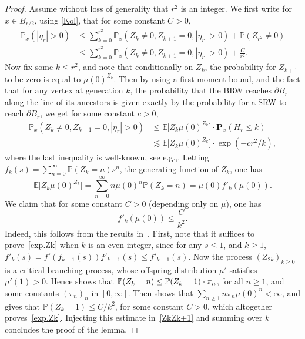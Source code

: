 \documentclass[11pt]{article}
\newcommand{\eg}{e.g.,\xspace}
\numberwithin{equation}{section}
\theoremstyle{plain}
\theoremstyle{definition}
\newcommand{\1}{{\text{\Large $\mathfrak 1$}}}
\begin{document}
\begin{proof}
Assume without loss of generality that $r^2$ is an integer. We first write for $x\in B_{r/2}$, using \eqref{Kol}, that for some constant $C>0$,
\begin{align*}
\mathbb P_x(|\eta_r| >0 ) & \le \sum_{k=0}^{r^2} \mathbb P_x(Z_k\neq 0, Z_{k+1}=0, |\eta_r|>0) + \mathbb P(Z_{r^2} \neq 0) \\
& \le\sum_{k=0}^{r^2} \mathbb P_x(Z_k\neq 0, Z_{k+1}=0, |\eta_r|>0) + \frac{C}{r^2}.
\end{align*}
Now fix some $k\le r^2$, and note that conditionally on $Z_k$, the probability for $Z_{k+1}$ to be zero is equal to $\mu(0)^{Z_k}$. Then by using a first moment bound, and the fact that for any vertex at generation $k$, the probability that the BRW reaches $\partial B_r$ along the line of its ancestors is given exactly by the probability for a SRW to reach $\partial B_r$, we get for some constant $c>0$,
\begin{align} \label{ZkZk+1}
\nonumber \mathbb P_x(Z_k\neq 0, Z_{k+1}=0, |\eta_r|>0) & \le \mathbb E\big[Z_k \mu(0)^{Z_k}\big]\cdot \mathbf P_x(H_r\le k) \\
& \lesssim \mathbb E\big[Z_k \mu(0)^{Z_k}\big]\cdot \exp(-cr^2/k),
\end{align}
where the last inequality is well-known, see \eg \cite[Prop.\,2.1.2]{LL10}. Letting $f_k(s) = \sum_{n=0}^\infty \mathbb P(Z_k=n)s^n$, the generating function of $Z_k$, one has
\[
\mathbb E\big[Z_k \mu(0)^{Z_k}\big] = \sum_{n=0}^\infty n\mu(0)^n \mathbb P(Z_k=n) = \mu(0) f'_k(\mu(0)).
\]
We claim that for some constant $C>0$ (depending only on $\mu$), one has
\begin{equation}\label{exp.Zk}
f'_k(\mu(0)) \le \frac C{k^2}.
\end{equation}
Indeed, this follows from the results in~\cite{AN}. First, note that it suffices to prove~\eqref{exp.Zk} when $k$ is an even integer, since for any $s\le 1$, and $k\ge 1$, $f'_k(s) = f'(f_{k-1}(s)) f'_{k-1}(s)\le f'_{k-1}(s)$.
Now the process $(Z_{2k})_{k\ge 0}$ is a critical branching process, whose offspring distribution $\mu'$ satisfies $\mu'(1) >0$.
Hence \cite[Lem.\,2 p.\,12]{AN} shows that $\mathbb P(Z_k=\nobreak n) \le \mathbb P(Z_k=1)\cdot \pi_n$, for all $n\ge 1$, and some constants $(\pi_n)_n$ in $[0,\infty]$. Then \cite[Th.\,2 p.\,13]{AN} shows that $\sum_{n\ge 1} n\pi_n\mu(0)^n <\infty$, and \cite[Cor.\,2 p.\,23]{AN} gives that $\mathbb P(Z_k=1) \le C/k^2$, for some constant $C>0$, which altogether proves~\eqref{exp.Zk}. Injecting this estimate in~\eqref{ZkZk+1} and summing over $k$ concludes the proof of the lemma.
\end{proof}
\end{document}
